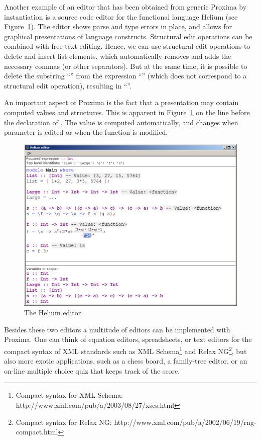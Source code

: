 \documentclass[10pt]{article}
\begin{document}
Another example of an editor that has been obtained from generic Proxima by instantiation is a source code editor for the functional language Helium (see Figure~\ref{fig:heliumEditor}). The editor shows parse and type errors in place, and allows for graphical presentations of language constructs. Structural edit operations can be combined with free-text editing. Hence, we can use structural edit operations to delete and insert list elements, which automatically removes and adds the necessary commas (or other separators). But at the same time, it is possible to delete the substring ``'' from the expression ``\p{[ 1+2, 3]}'' (which does not correspond to a structural edit operation), resulting in ``\p{[ 13 ]}''.


An important aspect of Proxima is the fact that a presentation may contain computed values and structures. This is apparent in Figure~\ref{fig:heliumEditor} on the line before the declaration of . The value  is computed automatically, and changes when parameter  is edited or when the function  is modified.

\begin{figure}
\begin{center}
\includegraphics[width=12cm]{images/heliumMainWindow}
\end{center}
\caption{The Helium editor.}
\label{fig:heliumEditor}
\end{figure}

Besides these two editors a multitude of editors can be implemented with Proxima. One can think of equation editors, spreadsheets, or text editors for the compact syntax of XML standards such as XML Schema\footnote{Compact syntax for XML Schema: http://www.xml.com/pub/a/2003/08/27/xscs.html} and Relax NG\footnote{Compact syntax for Relax NG: http://www.xml.com/pub/a/2002/06/19/rng-compact.html}, but also more exotic applications, such as a chess board, a family-tree editor, or an on-line multiple choice quiz that keeps track of the score.
\end{document}
